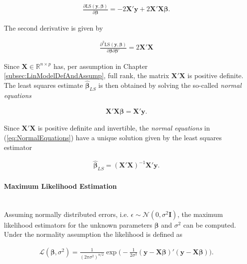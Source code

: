 \documentclass[10pt,a4paper]{article}
\newcommand{\subsubsubsection}[1]{\paragraph{#1}\mbox{}\\}
\begin{document}
\begin{align} \label{eq:LS_1st_derivative}
	\frac{\partial \text{LS}(\boldsymbol{y}, \boldsymbol{\beta})}{\partial \boldsymbol{\beta}} = -2\boldsymbol{X}' \boldsymbol{y} + 2\boldsymbol{X}'\boldsymbol{X} \boldsymbol{\beta}.
\end{align}

The second derivative is given by

\begin{align} \label{eq:LS_2nd_derivative}
	\frac{\partial^2 \text{LS}(\boldsymbol{y}, \boldsymbol{\beta})}{\partial \boldsymbol{\beta} \partial \boldsymbol{\beta}'} = 2\boldsymbol{X}'\boldsymbol{X}
\end{align}
	
Since $\boldsymbol{X} \in \mathbb{R}^{n \times p}$ has, per assumption in Chapter \ref{subsec:LinModelDefAndAssump},  full rank, the matrix $ \boldsymbol{X}'\boldsymbol{X}$ is positive definite. The least squares estimate $\boldsymbol{\hat{\beta}}_{LS}$ is then obtained by solving the so-called \emph{normal equations}

\begin{align} \label{eq:NormalEquations}
	\boldsymbol{X}' \boldsymbol{X} \boldsymbol{\beta} = \boldsymbol{X}' \boldsymbol{y}.
\end{align}

Since $\boldsymbol{X}'\boldsymbol{X}$ is positive definite and invertible, the \emph{normal equations} in (\ref{eq:NormalEquations}) have a unique solution given by the least squares estimator

\begin{align} \label{eq:LS_estimator}
	\boldsymbol{\hat{\beta}}_{LS} = (\boldsymbol{X}'\boldsymbol{X})^{-1} \boldsymbol{X}'\boldsymbol{y}.
\end{align}

\subsubsubsection{Maximum Likelihood Estimation}

Assuming normally distributed errors, i.e. $\epsilon \sim \mathcal N(0, \sigma^2 \boldsymbol{I})$, the maximum likelihood estimators for the unknown parameters $\boldsymbol{\beta}$ and $\sigma^2$ can be computed. \cite{wood2017generalized} Under the normality assumption the likelihood is defined as

\begin{align} \label{eq:likelihood}
	\mathcal{L}(\boldsymbol{\beta}, \sigma^2) = \frac{1}{(2\pi\sigma^2)^{n/2}} \exp \Big( -\frac{1}{2\sigma^2}(\boldsymbol{y} - \boldsymbol{X} \boldsymbol{\beta})'(\boldsymbol{y} - \boldsymbol{X} \boldsymbol{\beta}) \Big).
\end{align}
\end{document}
